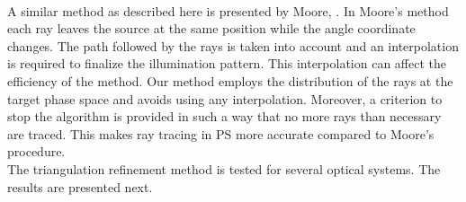 \\ \indent A similar method as described here is presented by Moore, \cite{moore2013methods}. In Moore's method each ray leaves the source at the same position while the angle coordinate changes. The path followed by the rays is taken into account and an interpolation is required to finalize the illumination pattern.
 This interpolation can affect the efficiency of the method. Our method employs the distribution of the rays at the target phase space and avoids using any interpolation. Moreover, a criterion to stop the algorithm is provided in such a way that no more rays than necessary are traced. This makes ray tracing in PS more accurate compared to Moore's procedure. \\ \indent
The triangulation refinement method is tested for several optical systems. The results are presented next.
